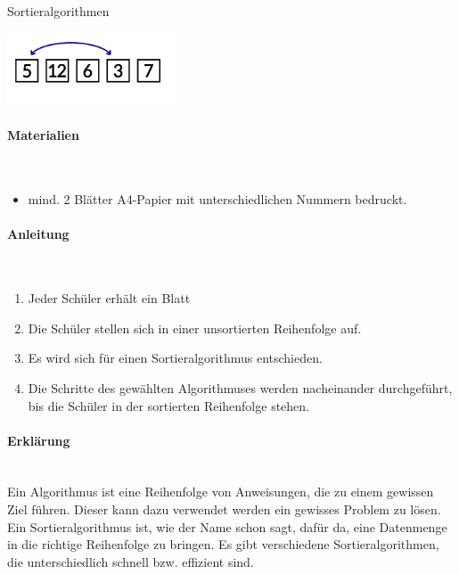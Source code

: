 \documentclass[a4paper, 12pt]{report}
\begin{document}
	\thispagestyle{empty}
	
	{
		\centering
		\Huge
		\color{blue}
		Sortieralgorithmen
	}
	
	\centering
	\includegraphics[width=5cm]{IMG_1125.JPG}
	\raggedright
	\paragraph{\color{blue}Materialien} \mbox{} \\
	\begin{itemize}
		\item mind. 2 Blätter A4-Papier mit unterschiedlichen Nummern bedruckt.
	\end{itemize}
	
	\raggedright
	\paragraph{\color{blue}Anleitung} \mbox{} \\
	\begin{enumerate}
		\item Jeder Schüler erhält ein Blatt
		\item Die Schüler stellen sich in einer unsortierten Reihenfolge auf.
		\item Es wird sich für einen Sortieralgorithmus entschieden.
		\item Die Schritte des gewählten Algorithmuses werden nacheinander durchgeführt, bis die Schüler in der sortierten Reihenfolge stehen.
	\end{enumerate}
	
	\raggedright
	\paragraph{\color{blue}Erklärung} \mbox{} \\
	
	Ein Algorithmus ist eine Reihenfolge von Anweisungen, die zu einem gewissen Ziel führen.
	Dieser kann dazu verwendet werden ein gewisses Problem zu lösen.
	Ein Sortieralgorithmus ist, wie der Name schon sagt, dafür da, eine Datenmenge in die richtige Reihenfolge zu bringen.
	Es gibt verschiedene Sortieralgorithmen, die unterschiedlich schnell bzw. effizient sind.	\newpage
	
\end{document}
